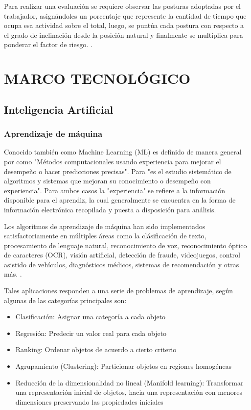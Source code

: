 Para realizar una evaluación se requiere observar las posturas adoptadas por el trabajador, asignándoles un porcentaje que represente la cantidad de tiempo que ocupa esa actividad sobre el total, luego, se puntúa cada postura con respecto a el grado de inclinación desde la posición natural y finalmente se multiplica para ponderar el factor de riesgo. \parencite{Nogareda2009TareasErgonomicos}.
\section{MARCO TECNOLÓGICO}
\subsection{Inteligencia Artificial}
\subsubsection{Aprendizaje de máquina}
Conocido también como Machine Learning (ML) es definido de manera general por \parencite{MehryarMohriAfshinRostamizadeh2012FoundationsLearning} como "Métodos computacionales usando experiencia para mejorar el desempeño o hacer predicciones precisas". Para \parencite{Flach2012MachineLearning} "es el estudio sistemático de algoritmos y sistemas
que mejoran su conocimiento o desempeño con experiencia". Para ambos casos la "experiencia" se refiere a la información disponible para el aprendiz, la cual generalmente se encuentra en la forma de información electrónica recopilada y puesta a disposición para análisis.

Los algoritmos de aprendizaje de máquina han sido implementados satisfactoriamente en múltiples áreas como la clásificación de texto, procesamiento de lenguaje natural, reconocimiento de voz, reconocimiento óptico de caracteres (OCR), visión artificial, detección de fraude, videojuegos, control asistido de vehículos, diagnósticos médicos, sistemas de recomendación y otras más. \parencite{MehryarMohriAfshinRostamizadeh2012FoundationsLearning}.

Tales aplicaciones responden a una serie de problemas de aprendizaje, según \parencite{MehryarMohriAfshinRostamizadeh2012FoundationsLearning} algunas de las categorías principales son:
\begin{itemize}
    \item Clasificación: Asignar una categoría a cada objeto
    \item Regresión: Predecir un valor real para cada objeto
    \item Ranking: Ordenar objetos de acuerdo a cierto criterio
    \item Agrupamiento (Clustering): Particionar objetos en regiones homogéneas
    \item Reducción de la dimensionalidad no lineal (Manifold learning): Transformar una representación inicial de objetos, hacia una representación con menores dimensiones preservando las propiedades iniciales
\end{itemize}

